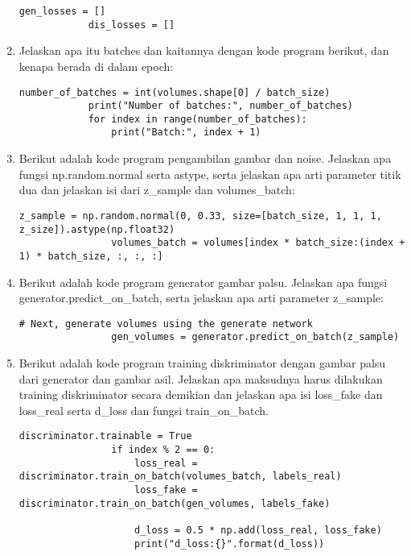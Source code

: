 \begin{enumerate}
\begin{lstlisting}[caption=Setting Epoch,label={lst:8.7}]
            gen_losses = []
            dis_losses = []
\end{lstlisting}
\item
Jelaskan apa itu batches dan kaitannya dengan kode program berikut, dan kenapa berada di dalam epoch:
\begin{lstlisting}[caption=Setting Batch,label={lst:8.8}]
            number_of_batches = int(volumes.shape[0] / batch_size)
            print("Number of batches:", number_of_batches)
            for index in range(number_of_batches):
                print("Batch:", index + 1)
\end{lstlisting}
\item
Berikut adalah kode program pengambilan gambar dan noise. Jelaskan apa fungsi np.random.normal serta astype, serta jelaskan apa arti parameter titik dua dan jelaskan isi dari z\_sample dan volumes\_batch:
\begin{lstlisting}[caption=Set real images dan vektor noise,label={lst:8.9}]
                z_sample = np.random.normal(0, 0.33, size=[batch_size, 1, 1, 1, z_size]).astype(np.float32)
                volumes_batch = volumes[index * batch_size:(index + 1) * batch_size, :, :, :]
\end{lstlisting}

\item
Berikut adalah kode program generator gambar palsu. Jelaskan apa fungsi generator.predict\_on\_batch, serta jelaskan apa arti parameter z\_sample:
\begin{lstlisting}[caption=Generator Gambar Palsu,label={lst:8.10}]
                # Next, generate volumes using the generate network
                gen_volumes = generator.predict_on_batch(z_sample)
\end{lstlisting}

\item
Berikut adalah kode program training diskriminator dengan gambar palsu dari generator dan gambar asil. Jelaskan apa maksudnya harus dilakukan training diskriminator secara demikian dan jelaskan apa isi loss\_fake dan loss\_real serta d\_loss dan fungsi train\_on\_batch.
\begin{lstlisting}[caption=Training Diskriminator,label={lst:8.11}]
                discriminator.trainable = True
                if index % 2 == 0:
                    loss_real = discriminator.train_on_batch(volumes_batch, labels_real)
                    loss_fake = discriminator.train_on_batch(gen_volumes, labels_fake)

                    d_loss = 0.5 * np.add(loss_real, loss_fake)
                    print("d_loss:{}".format(d_loss))


\end{lstlisting}
\end{enumerate}
